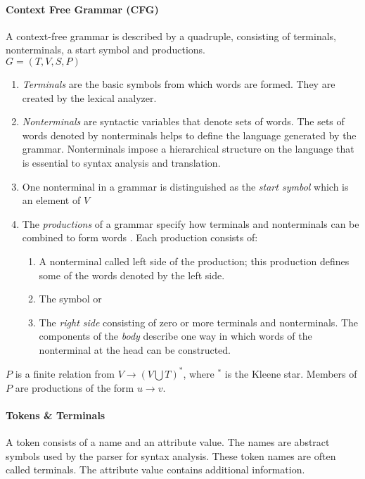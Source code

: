 \paragraph{Context Free Grammar (CFG)}
A context-free grammar is described by a quadruple, consisting of terminals, nonterminals, a start symbol and productions.\\
$G = (T, V, S, P)$
\begin{enumerate}
	\item \emph{Terminals} are the basic symbols from which words are formed.  They are created by the lexical analyzer.
	\item \emph{Nonterminals} are syntactic variables that denote sets of words. The sets of words denoted by nonterminals helps to define the language generated by the grammar. Nonterminals impose a hierarchical structure on the language that is essential to syntax analysis and translation.
	\item One nonterminal in a grammar is distinguished as the \emph{start symbol} which is an element of $V$
	\item The \emph{productions} of a grammar specify how terminals and nonterminals can be combined to form words . Each production consists of:
	\begin{enumerate}
		\item A nonterminal called left side of the production; this production defines some of the words denoted by the left side.
		\item The symbol \code{$\rightarrow$}  or  \code{::=} 
		\item The \emph{right side} consisting of zero or more terminals and nonterminals. The components of the \emph{body} describe one way in which words of the nonterminal at the head can be constructed.
	\end{enumerate}
\end{enumerate}
 $P$ is a finite relation from $V \rightarrow (V  \bigcup  T)^*$, where $^*$ is the Kleene star. Members of $P$ are productions of the form $u \rightarrow v$. \cite{DragonBook}


\paragraph{Tokens \& Terminals}  
A token consists of a name and an attribute value. The names are abstract symbols used by the parser for syntax analysis. These token names are often called terminals. The attribute value contains additional information. \cite{DragonBook}


